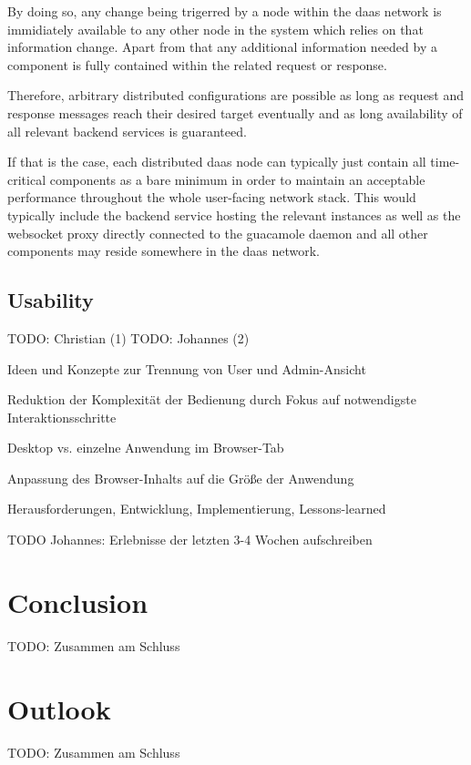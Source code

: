 \documentclass[runningheads]{llncs}
\begin{document}
By doing so, any change being trigerred by a node within the daas network
is immidiately available to any other node in the system
which relies on that information change.
Apart from that any additional information needed by a component
is fully contained within the related request or response.

Therefore, arbitrary distributed configurations are possible
as long as request and response messages reach their desired target eventually
and as long availability of all relevant backend services is guaranteed.

If that is the case, each distributed daas node can typically
just contain all time-critical components as a bare minimum
in order to maintain an acceptable performance throughout the whole user-facing network stack.
This would typically include the backend service hosting the relevant instances
as well as the websocket proxy directly connected to the guacamole daemon
and all other components may reside somewhere in the daas network.


\subsection{Usability}

TODO: Christian (1)
TODO: Johannes (2)

Ideen und Konzepte zur Trennung von User und Admin-Ansicht

Reduktion der Komplexität der Bedienung durch Fokus auf notwendigste Interaktionsschritte

Desktop vs. einzelne Anwendung im Browser-Tab

Anpassung des Browser-Inhalts auf die Größe der Anwendung

Herausforderungen, Entwicklung, Implementierung, Lessons-learned

TODO Johannes: Erlebnisse der letzten 3-4 Wochen aufschreiben



\section{Conclusion}
\label{sec:Conclusions}

TODO: Zusammen am Schluss

\section{Outlook}
\label{sec:NextSteps}

TODO: Zusammen am Schluss
\end{document}

